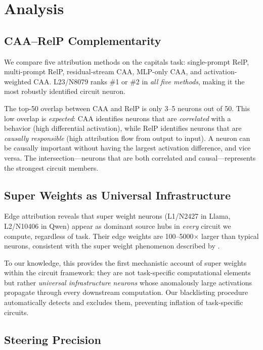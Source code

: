 \documentclass[11pt]{article}
\begin{document}
\section{Analysis}
\label{sec:analysis}

\subsection{CAA--RelP Complementarity}

We compare five attribution methods on the capitals task: single-prompt RelP, multi-prompt RelP, residual-stream CAA, MLP-only CAA, and activation-weighted CAA.
L23/N8079 ranks \#1 or \#2 in \emph{all five methods}, making it the most robustly identified circuit neuron.

The top-50 overlap between CAA and RelP is only 3--5 neurons out of 50.
This low overlap is \emph{expected}: CAA identifies neurons that are \emph{correlated} with a behavior (high differential activation), while RelP identifies neurons that are \emph{causally responsible} (high attribution flow from output to input).
A neuron can be causally important without having the largest activation difference, and vice versa.
The intersection---neurons that are both correlated and causal---represents the strongest circuit members.

\subsection{Super Weights as Universal Infrastructure}

Edge attribution reveals that super weight neurons (L1/N2427 in Llama, L2/N10406 in Qwen) appear as dominant source hubs in \emph{every} circuit we compute, regardless of task.
Their edge weights are 100--5000$\times$ larger than typical neurons, consistent with the super weight phenomenon described by \citet{yu2024superweights}.

To our knowledge, this provides the first mechanistic account of super weights within the circuit framework: they are not task-specific computational elements but rather \emph{universal infrastructure neurons} whose anomalously large activations propagate through every downstream computation.
Our blacklisting procedure automatically detects and excludes them, preventing inflation of task-specific circuits.

\subsection{Steering Precision}
\end{document}
